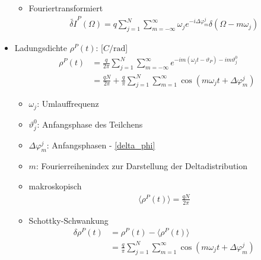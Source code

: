 \documentclass[12pt]{article}%
\renewcommand{\phi}{\varphi}
\renewcommand{\theta}{\vartheta}
\newcommand{\itemf}{\item[$\circ$]}
\begin{document}
\begin{itemize}
\begin{itemize}
	\itemf Fouriertransformiert
	\begin{align}
		\widetilde{\delta I}^P(\Omega) = q  \sum_{j=1}^{N}\sum_{m=-\infty}^{\infty} \omega_j e^{-i \Delta \phi_m^j} \delta(\Omega - m \omega_j)
	\end{align}
	
	\end{itemize}

\item Ladungsdichte $\rho^P(t)$: [$C / \textrm{rad}$]
\begin{subequations}
\begin{align} \label{eq:chargedensity_coasting_longitudinal}
\rho^P(t) &= \frac{q}{2\pi}\sum_{j=1}^{N}\sum_{m=-\infty}^{\infty}e^{-im(\omega_jt - \theta_P) - i m \theta_j^0} \\
&= \frac{qN}{2\pi} + \frac{q}{\pi}\sum_{j=1}^{N}\sum_{m=1}^{\infty}\cos(m\omega_j t + \Delta \phi^j_m)
\end{align}
\end{subequations}

	\begin{itemize}
	
		\item $\omega_j$: Umlauffrequenz
		\item $\theta_j^0$: Anfangsphase des Teilchens
		\item $\Delta \phi_m^j$: Anfangsphasen - \eqref{delta_phi}
		\item $m$: Fourierreihenindex zur Darstellung der Deltadistribution
	
	\end{itemize}
	
	\begin{itemize}
		\itemf makroskopisch
		\begin{align}
			\langle \rho^P(t) \rangle = \frac{qN}{2\pi}
		\end{align}
	
		\itemf Schottky-Schwankung
		\begin{subequations}
		\begin{align}
			\delta \rho^P(t) &= \rho^P(t) - \langle \rho^P(t)\rangle \\
			&= \frac{q}{\pi}\sum_{j=1}^{N}\sum_{m=1}^{\infty}\cos(m\omega_j t + \Delta \phi_m^j)
		\end{align}
		\end{subequations}
	
	\end{itemize}


\end{itemize}
\end{document}
